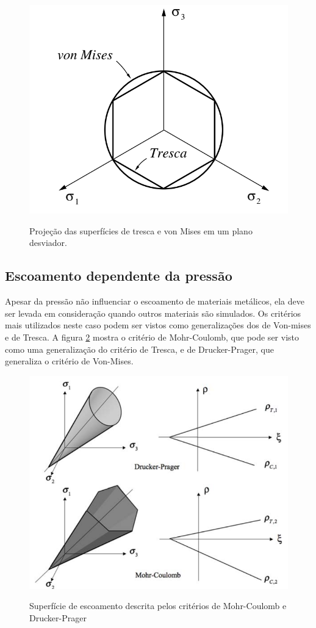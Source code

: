 \begin{figure}[H]
    \centering
    \caption{Projeção das superfícies de tresca e von Mises em um plano desviador.}
    \includegraphics[width=0.7\linewidth]{images/trescaemises.png} %
    \label{fig:trescamises}
\end{figure}


\subsection{Escoamento dependente da pressão}

Apesar da pressão não influenciar o escoamento de materiais metálicos, ela deve ser levada em consideração quando outros materiais são simulados. Os critérios mais utilizados neste caso podem ser vistos como generalizações dos de Von-mises e de Tresca. A figura \ref{fig:mohrDrucker} mostra o critério de Mohr-Coulomb, que pode ser visto como uma generalização do critério de Tresca, e de Drucker-Prager, que generaliza o critério de Von-Mises.

\begin{figure}
    \centering
    \caption{Superfície de escoamento descrita pelos critérios de Mohr-Coulomb e Drucker-Prager}
    \includegraphics[width=0.7\linewidth]{images/tmohrdrucker.png}
    \label{fig:mohrDrucker}
\end{figure}

